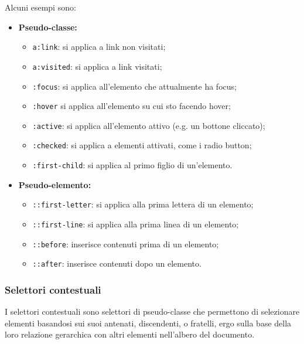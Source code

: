 \documentclass[a4paper,11pt]{article}
\begin{document}
Alcuni esempi sono:
\begin{itemize}
	\item \textbf{Pseudo-classe:}
		\begin{itemize}
			\item \lstinline|a:link|: si applica a link non visitati;
			\item \lstinline|a:visited|: si applica a link visitati;
			\item \lstinline|:focus|: si applica all'elemento che attualmente ha focus;
			\item \lstinline|:hover| si applica all'elemento su cui sto facendo hover;
			\item \lstinline|:active|: si applica all'elemento attivo (e.g. un bottone cliccato);
			\item \lstinline|:checked|: si applica a elementi attivati, come i radio button;
			\item \lstinline|:first-child|: si applica al primo figlio di un'elemento.
		\end{itemize}
	\item \textbf{Pseudo-elemento:}
		\begin{itemize}
			\item \lstinline|::first-letter|: si applica alla prima lettera di un elemento;
			\item \lstinline|::first-line|: si applica alla prima linea di un elemento;
			\item \lstinline|::before|: inserisce contenuti prima di un elemento;
			\item \lstinline|::after|: inserisce contenuti dopo un elemento.
		\end{itemize}
\end{itemize}

\subsubsection{Selettori contestuali}
I selettori contestuali sono selettori di pseudo-classe che permettono di selezionare elementi basandosi sui suoi antenati, discendenti, o fratelli, ergo sulla base della loro relazione gerarchica con altri elementi nell'albero del documento.
\end{document}
